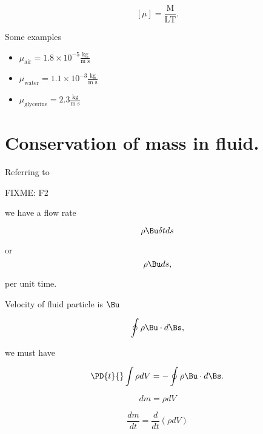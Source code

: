 \begin{equation}\label{eqn:continuumL9:290}
[\mu] = \frac{\text{M}}{\text{L}\text{T}}.
\end{equation}

Some examples

\begin{itemize}
\item $\mu_{\text{air}} = 1.8 \times 10^{-5} \frac{\text{kg}}{\text{m s}}$
\item $\mu_{\text{water}} = 1.1 \times 10^{-3} \frac{\text{kg}}{\text{m s}}$
\item $\mu_{\text{glycerine}} = 2.3 \frac{\text{kg}}{\text{m s}}$
\end{itemize}

\section{Conservation of mass in fluid.}

Referring to 

FIXME: F2

we have a flow rate

\begin{equation}\label{eqn:continuumL9:310}
\rho \Bu \delta t ds
\end{equation}

or 
\begin{equation}\label{eqn:continuumL9:330}
\rho \Bu ds,
\end{equation}

per unit time.

Velocity of fluid particle is $\Bu$

\begin{equation}\label{eqn:continuumL9:350}
\oint \rho \Bu \cdot d\Bs,
\end{equation}

we must have

\begin{equation}\label{eqn:continuumL9:n}
\PD{t}{} \int \rho dV 
=
-\oint \rho \Bu \cdot d\Bs.
\end{equation}

\begin{equation}\label{eqn:continuumL9:370}
dm = \rho dV
\end{equation}

\begin{equation}\label{eqn:continuumL9:390}
\frac{dm}{dt} = \frac{d}{dt} (\rho dV)
\end{equation}

